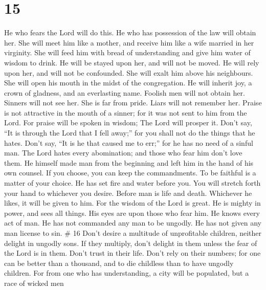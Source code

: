 \hypertarget{section-4}{%
\section{15}\label{section-4}}

 He who fears the Lord will do this. He who has possession
of the law will obtain her.  She will meet him like a
mother, and receive him like a wife married in her virginity.
 She will feed him with bread of understanding and give him
water of wisdom to drink.  He will be stayed upon her, and
will not be moved. He will rely upon her, and will not be confounded.
 She will exalt him above his neighbours. She will open his
mouth in the midst of the congregation.  He will inherit
joy, a crown of gladness, and an everlasting name.  Foolish
men will not obtain her. Sinners will not see her.  She is
far from pride. Liars will not remember her.  Praise is not
attractive in the mouth of a sinner; for it was not sent to him from the
Lord.  For praise will be spoken in wisdom; The Lord will
prosper it.  Don't say, ``It is through the Lord that I
fell away;'' for you shall not do the things that he hates.
 Don't say, ``It is he that caused me to err;'' for he has
no need of a sinful man.  The Lord hates every abomination;
and those who fear him don't love them.  He himself made
man from the beginning and left him in the hand of his own counsel.
 If you choose, you can keep the commandments. To be
faithful is a matter of your choice.  He has set fire and
water before you. You will stretch forth your hand to whichever you
desire.  Before man is life and death. Whichever he likes,
it will be given to him.  For the wisdom of the Lord is
great. He is mighty in power, and sees all things.  His
eyes are upon those who fear him. He knows every act of man.
 He has not commanded any man to be ungodly. He has not
given any man license to sin. \# 16  Don't desire a
multitude of unprofitable children, neither delight in ungodly sons.
 If they multiply, don't delight in them unless the fear of
the Lord is in them.  Don't trust in their life. Don't rely
on their numbers; for one can be better than a thousand, and to die
childless than to have ungodly children.  For from one who
has understanding, a city will be populated, but a race of wicked men
